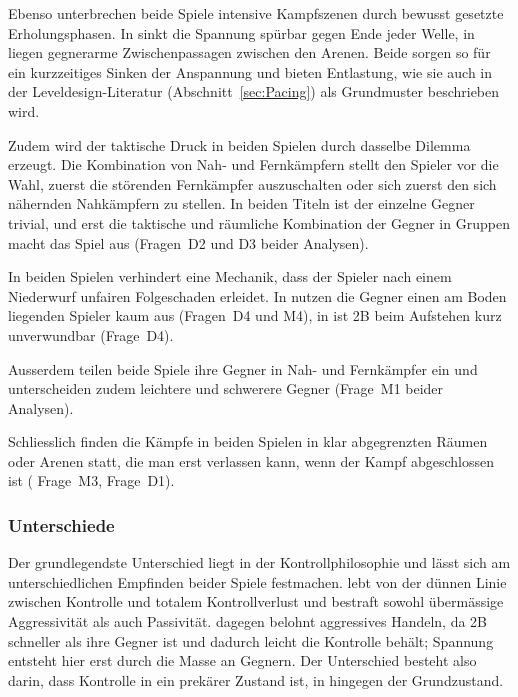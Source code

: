 \documentclass[../Main.tex]{subfiles}
\begin{document}
Ebenso unterbrechen beide Spiele intensive Kampfszenen durch bewusst gesetzte Erholungsphasen. In  sinkt die Spannung spürbar gegen Ende jeder Welle, in  liegen gegnerarme Zwischenpassagen zwischen den Arenen. Beide sorgen so für ein kurzzeitiges Sinken der Anspannung und bieten Entlastung, wie sie auch in der Leveldesign-Literatur (Abschnitt~\ref{sec:Pacing}) als Grundmuster beschrieben wird.

Zudem wird der taktische Druck in beiden Spielen durch dasselbe Dilemma erzeugt. Die Kombination von Nah- und Fernkämpfern stellt den Spieler vor die Wahl, zuerst die störenden Fernkämpfer auszuschalten oder sich zuerst den sich nähernden Nahkämpfern zu stellen. In beiden Titeln ist der einzelne Gegner trivial, und erst die taktische und räumliche Kombination der Gegner in Gruppen macht das Spiel aus (Fragen~D2 und D3 beider Analysen).

In beiden Spielen verhindert eine Mechanik, dass der Spieler nach einem Niederwurf unfairen Folgeschaden erleidet. In  nutzen die Gegner einen am Boden liegenden Spieler kaum aus (Fragen~D4 und M4), in  ist 2B beim Aufstehen kurz unverwundbar (Frage~D4).

Ausserdem teilen beide Spiele ihre Gegner in Nah- und Fernkämpfer ein und unterscheiden zudem leichtere und schwerere Gegner (Frage~M1 beider Analysen).

Schliesslich finden die Kämpfe in beiden Spielen in klar abgegrenzten Räumen oder Arenen statt, die man erst verlassen kann, wenn der Kampf abgeschlossen ist ( Frage~M3,  Frage~D1).

\subsubsection{Unterschiede}

Der grundlegendste Unterschied liegt in der Kontrollphilosophie und lässt sich am unterschiedlichen Empfinden beider Spiele festmachen.  lebt von der dünnen Linie zwischen Kontrolle und totalem Kontrollverlust und bestraft sowohl übermässige Aggressivität als auch Passivität.  dagegen belohnt aggressives Handeln, da 2B schneller als ihre Gegner ist und dadurch leicht die Kontrolle behält; Spannung entsteht hier erst durch die Masse an Gegnern. Der Unterschied besteht also darin, dass Kontrolle in  ein prekärer Zustand ist, in  hingegen der Grundzustand.
\end{document}
